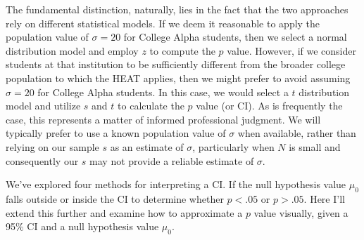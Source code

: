 \documentclass[
  letterpaper,
  DIV=11,
  numbers=noendperiod]{scrreprt}
\begin{document}
The fundamental distinction, naturally, lies in the fact that the two
approaches rely on different statistical models. If we deem it
reasonable to apply the population value of \(\sigma = 20\) for College
Alpha students, then we select a normal distribution model and employ
\(z\) to compute the \(p\) value. However, if we consider students at
that institution to be sufficiently different from the broader college
population to which the HEAT applies, then we might prefer to avoid
assuming \(\sigma = 20\) for College Alpha students. In this case, we
would select a \(t\) distribution model and utilize \(s\) and \(t\) to
calculate the \(p\) value (or CI). As is frequently the case, this
represents a matter of informed professional judgment. We will typically
prefer to use a known population value of \(\sigma\) when available,
rather than relying on our sample \(s\) as an estimate of \(\sigma\),
particularly when \(N\) is small and consequently our \(s\) may not
provide a reliable estimate of \(\sigma\).

We've explored four methods for interpreting a CI. If the null
hypothesis value \(\mu_0\) falls outside or inside the CI to determine
whether \(p < .05\) or \(p > .05\). Here I'll extend this further and
examine how to approximate a \(p\) value visually, given a 95\% CI and a
null hypothesis value \(\mu_0\).
\end{document}
